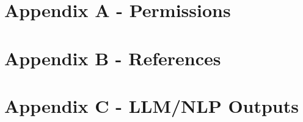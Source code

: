 \documentclass[12pt, letterpaper]{article}
\begin{document}
\begin{singlespace}
		\newpage
		\section{Appendix A - Permissions}
		
		
		\newpage
		\section{Appendix B - References}
		
		
		\newpage
		\section{Appendix C - LLM/NLP Outputs}
		
	
	\end{singlespace}
\end{document}

